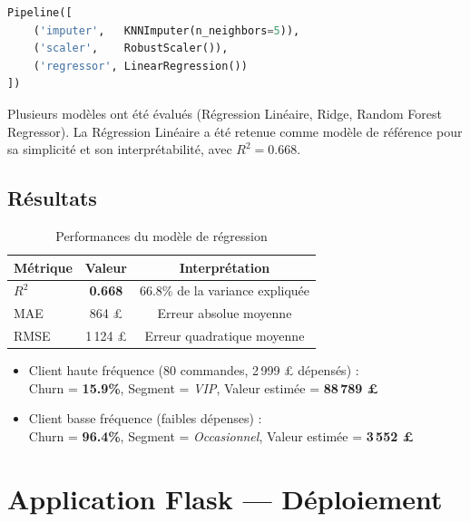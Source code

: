 \documentclass[12pt,a4paper]{article}
\begin{document}
\begin{lstlisting}[language=Python, caption=Pipeline de régression]
Pipeline([
    ('imputer',   KNNImputer(n_neighbors=5)),
    ('scaler',    RobustScaler()),
    ('regressor', LinearRegression())
])
\end{lstlisting}

Plusieurs modèles ont été évalués (Régression Linéaire, Ridge, Random Forest Regressor).
La Régression Linéaire a été retenue comme modèle de référence pour sa simplicité
et son interprétabilité, avec $R^2 = 0.668$.

\subsection{Résultats}

\begin{table}[H]
\centering
\caption{Performances du modèle de régression}
\begin{tabular}{lcc}
\toprule
\textbf{Métrique} & \textbf{Valeur} & \textbf{Interprétation} \\
\midrule
$R^2$  & \textbf{0.668} & 66.8\% de la variance expliquée \\
MAE    & 864 £          & Erreur absolue moyenne \\
RMSE   & 1\,124 £       & Erreur quadratique moyenne \\
\bottomrule
\end{tabular}
\end{table}

\begin{resultbox}
\begin{itemize}
  \item Client haute fréquence (80 commandes, 2\,999 £ dépensés) :\\
        Churn = \textbf{15.9\%}, Segment = \textit{VIP}, Valeur estimée = \textbf{88\,789 £}
  \item Client basse fréquence (faibles dépenses) :\\
        Churn = \textbf{96.4\%}, Segment = \textit{Occasionnel}, Valeur estimée = \textbf{3\,552 £}
\end{itemize}
\end{resultbox}

\section{Application Flask — Déploiement}
\end{document}
